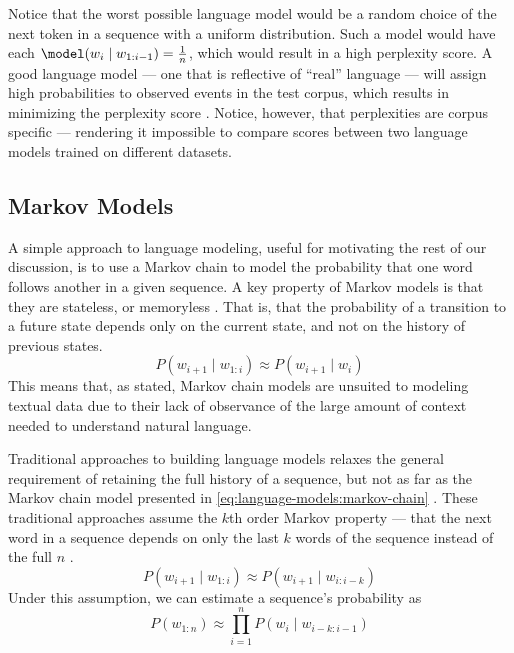 Notice that the worst possible language model would be a random choice of the next token in a sequence with a uniform distribution.
Such a model would have each $\model(w_i \mid w_{1:i-1}) = \frac{1}{n}$, which would result in a high perplexity score.
A good language model --- one that is reflective of ``real'' language --- will assign high probabilities to observed events in the test corpus, which results in minimizing the perplexity score \cite{goldberg_2017}.
Notice, however, that perplexities are corpus specific --- rendering it impossible to compare scores between two language models trained on different datasets.

\subsection{Markov Models}\label{sec:language-models:markov}

A simple approach to language modeling, useful for motivating the rest of our discussion, is to use a Markov chain to model the probability that one word follows another in a given sequence.
A key property of Markov models is that they are stateless, or memoryless \cite{gagniuc_2017}.
That is, that the probability of a transition to a future state depends only on the current state, and not on the history of previous states.
\begin{equation}
    P(w_{i + 1} \mid w_{1:i}) \approx P(w_{i+1} \mid w_i) \label{eq:language-models:markov-chain}
\end{equation}
This means that, as stated, Markov chain models are unsuited to modeling textual data due to their lack of observance of the large amount of context needed to understand natural language.

Traditional approaches to building language models relaxes the general requirement of retaining the full history of a sequence, but not as far as the Markov chain model presented in \autoref{eq:language-models:markov-chain} \cite{mikolov2012statistical}.
These traditional approaches assume the $k$th order Markov property --- that the next word in a sequence depends on only the last $k$ words of the sequence instead of the full $n$ \cite{goldberg_2017}.
\begin{equation}
    P(w_{i+1} \mid w_{1:i}) \approx P(w_{i+1} \mid w_{i:i-k}) \label{eq:language-models:k-order-markov}
\end{equation}
Under this assumption, we can estimate a sequence's probability as
\begin{equation}
    P(w_{1:n}) \approx \prod_{i=1}^n P(w_i \mid w_{i-k:i-1}) \label{eq:language-models:k-order-sequence-probability}
\end{equation}

